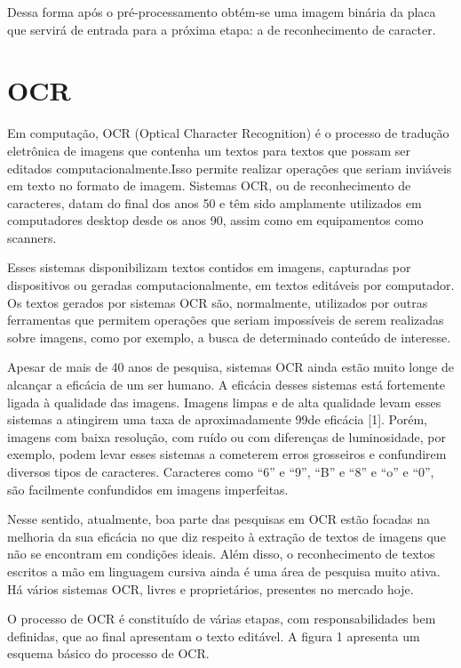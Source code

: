     Dessa forma após o pré-processamento obtém-se uma imagem binária da placa que servirá de entrada para a próxima etapa: a de reconhecimento de caracter.


    \section{OCR}
    
    Em computação, OCR (Optical Character Recognition) é o processo de tradução eletrônica de imagens que contenha um textos para textos que possam ser editados computacionalmente.Isso permite realizar operações que seriam inviáveis em texto no formato de imagem. Sistemas OCR, ou de reconhecimento de caracteres, datam do final dos anos 50 e têm sido amplamente utilizados em computadores desktop desde os anos 90, assim como em equipamentos como scanners.
     
    Esses sistemas disponibilizam textos contidos em imagens, capturadas por dispositivos ou geradas computacionalmente, em textos editáveis por computador. Os textos gerados por sistemas OCR são, normalmente, utilizados por outras ferramentas que permitem operações que seriam impossíveis de serem realizadas sobre imagens, como por exemplo, a busca de determinado conteúdo de interesse.
    
    Apesar de mais de 40 anos de pesquisa, sistemas OCR ainda estão muito longe de alcançar a eficácia de um ser humano. A eficácia desses sistemas está fortemente ligada à qualidade das imagens. Imagens limpas e de alta qualidade levam esses sistemas a atingirem uma taxa de aproximadamente 99\textdiscount de eficácia [1]. Porém, imagens com baixa resolução, com ruído ou com diferenças de luminosidade, por exemplo, podem levar esses sistemas a cometerem erros grosseiros e confundirem diversos tipos de caracteres. Caracteres como “6” e “9”, “B” e “8” e “o” e “0”, são facilmente confundidos em imagens imperfeitas.
    
    Nesse sentido, atualmente, boa parte das pesquisas em OCR estão focadas na melhoria da sua eficácia no que diz respeito à extração de textos de imagens que não se encontram em condições ideais. Além disso, o reconhecimento de textos escritos a mão em linguagem cursiva ainda é uma área de pesquisa muito ativa. Há vários sistemas OCR, livres e proprietários, presentes no mercado hoje.
    
    O processo de OCR é constituído de várias etapas, com responsabilidades bem definidas, que ao final apresentam o texto editável. A figura 1 apresenta um esquema básico do processo de OCR.
    
